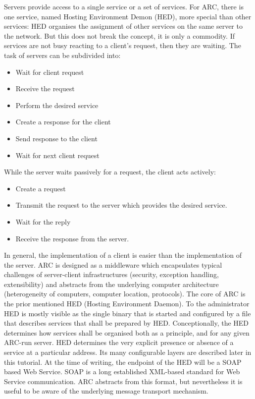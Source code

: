 Servers provide access to a single service or a set of services. For ARC, there is one service, named Hosting Environment Demon (HED), more special than other services: HED organises the assignment of other services on the same server to the network. But this does not break the concept, it is only a commodity. If services are not busy reacting to a client's request, then they are waiting. The task of servers can be subdivided into:
\begin{itemize}
 \item Wait for client request
 \item Receive the request
 \item Perform the desired service
 \item Create a response for the client
 \item Send response to the client
 \item Wait for next client request
\end{itemize}
While the server waits passively for a request, the client acts actively:
\begin{itemize}
 \item Create a request
 \item Transmit the request to the server which provides the desired service.
 \item Wait for the reply
 \item Receive the response from the server.
 \end{itemize}
\forcelinebreak

In general, the implementation of a client is easier than the implementation of the server. 
ARC is designed as a middleware which encapsulates typical challenges of server-client infrastructures (security, exception handling, extensibility) and abstracts from the underlying computer architecture (heterogeneity of computers, computer location, protocols).
The core of ARC is the prior mentioned HED (Hosting Environment Daemon).
To the administrator HED is mostly visible as the single binary that is started and configured by a file that describes services that shall be prepared by HED. 
Conceptionally, the HED determines how services shall be organised both as a principle, and for any given ARC-run server.
HED determines the very explicit presence or absence of a service at a particular address. Its many configurable layers are described later in this tutorial. 
%
At the time of writing, the endpoint of the HED will be a SOAP based  Web Service.
SOAP is a long established XML-based standard for Web Service communication.
ARC abstracts from this format, but nevertheless it is useful to be aware of
the underlying message transport mechanism.

